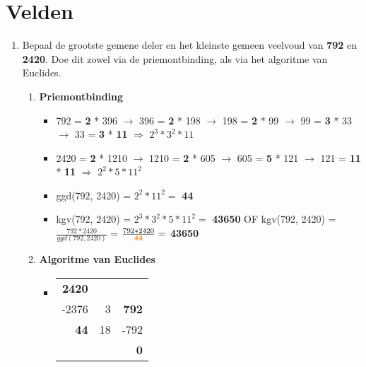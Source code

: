 \documentclass[12pt]{report}
\newcommand{\important}[1] {\textbf{\color{orange}#1}}
\begin{document}
\section{Velden}
\begin{enumerate}
	\item Bepaal de grootste gemene deler en het kleinste gemeen veelvoud van \important{792} en \important{2420}. Doe dit zowel via de 
	      priemontbinding, als via het algoritme van Euclides.
	      \begin{enumerate}
	      	\item \important{Priemontbinding} 
	      	      \begin{itemize}[label={}]
	      	      	\item 792 = \important{2} * 396 $\rightarrow$ 396 = \important{2} * 198 $\rightarrow$
	      	      	      198 = \important{2} * 99 $\rightarrow$ 99 = \important{3} * 33 $\rightarrow$ 33 = \important{3} * \important{11} 
	      	      	      $\Rightarrow$ $2^3 * 3^2 * 11$
	      	      	      	      	      	          
	      	      	\item 2420 = \important{2} * 1210 $\rightarrow$ 1210 = \important{2} * 605 $\rightarrow$ 605 = \important{5} * 121 $\rightarrow$ 
	      	      	      121 = \important{11} * \important{11} 
	      	      	      $\Rightarrow$ $2^2 * 5 * 11^2$
	      	      	      	      	      	          
	      	      	\item ggd(792, 2420) = $2^2 * 11^2 = $ \important{44}
	      	      	\item kgv(792, 2420) = $2^3 * 3^2 * 5 * 11^2 = $ \important{43650} \newline 
	      	      	      OF 
	      	      	      \newline kgv(792, 2420) = $\frac{792 * 2420}{ggd(792, 2420)}$ =
	      	      	      $\frac{792 * 2420}{\important{44}} = $ \important{43650}
	      	      \end{itemize}
	      	\item \important{Algoritme van Euclides}
	      	      \begin{itemize}[label={}]
	      	      	\item   \begin{tabular}{r|r|r}
	      	      	      \important{2420} & & \\
	      	      	      -2376 & 3 & \important{792} \\
	      	      	      \important{44} & 18 & -792 \\
	      	      	      & & \important{0}
	      	      	\end{tabular}
	      	      		      	      	

\end{itemize}
\end{enumerate}
\end{enumerate}
\end{document}
